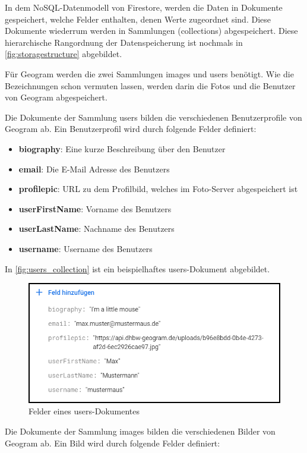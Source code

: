 In dem NoSQL-Datenmodell von Firestore, werden die Daten in Dokumente gespeichert, welche Felder enthalten, denen Werte zugeordnet sind. Diese Dokumente wiederrum werden in Sammlungen (collections) abgespeichert. Diese hierarchische Rangordnung der Datenspeicherung ist nochmals in \autoref{fig:storagestructure} abgebildet.

Für Geogram werden die zwei Sammlungen \glqq images\grqq{} und \glqq users\grqq{} benötigt. Wie die Bezeichnungen schon vermuten lassen, werden darin die Fotos und die Benutzer von Geogram abgespeichert.

Die Dokumente der Sammlung \glqq users\grqq{} bilden die verschiedenen Benutzerprofile von Geogram ab. Ein Benutzerprofil wird durch folgende Felder definiert:

\begin{itemize}
    \item \textbf{biography}: Eine kurze Beschreibung über den Benutzer
    \item \textbf{email}: Die E-Mail Adresse des Benutzers
    \item \textbf{profilepic}: URL zu dem Profilbild, welches im Foto-Server abgespeichert ist
    \item \textbf{userFirstName}: Vorname des Benutzers
    \item \textbf{userLastName}: Nachname des Benutzers
    \item \textbf{username}: Username des Benutzers
\end{itemize}

In \autoref{fig:users_collection} ist ein beispielhaftes users-Dokument abgebildet.

\begin{figure}[H]
    \centering
    \includegraphics[width=.7\linewidth]{images/collection_users.png}
    \caption{Felder eines \glqq users\grqq{}-Dokumentes}
    \label{fig:users_collection}
\end{figure}

Die Dokumente der Sammlung \glqq images\grqq{} bilden die verschiedenen Bilder von Geogram ab. Ein Bild wird durch folgende Felder definiert:

